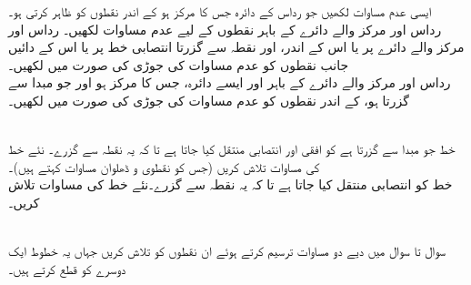 ایسی  عدم مساوات لکھیں جو رداس  کے دائرہ جس کا مرکز  ہو کے اندر نقطوں کو ظاہر کرتی ہو۔\\
رداس  اور مرکز  والے دائرے کے باہر نقطوں کے لیے عدم مساوات لکھیں۔
رداس  اور مرکز  والے  دائرے پر یا اس کے اندر، اور نقطہ   سے گزرتا انتصابی خط پر یا اس کے دائیں جانب نقطوں کو عدم مساوات کی جوڑی کی صورت میں لکھیں۔\\
رداس  اور مرکز والے  دائرے کے باہر اور ایسے دائرہ، جس کا مرکز  ہو اور جو مبدا سے گزرتا ہو، کے اندر نقطوں کو عدم مساوات کی جوڑی کی صورت میں لکھیں۔

\\

خط  جو مبدا سے گزرتا ہے کو افقی اور انتصابی منتقل کیا جاتا ہے تا کہ یہ نقطہ  سے گزرے۔ نئے خط کی مساوات تلاش کریں (جس کو نقطوی و ڈھلوان مساوات کہتے ہیں)۔\\
خط  کو انتصابی منتقل کیا جاتا ہے تا کہ یہ نقطہ  سے گزرے۔نئے خط کی مساوات تلاش کریں۔

\\

سوال  تا سوال  میں دیے دو مساوات ترسیم کرتے ہوئے ان نقطوں کو تلاش کریں جہاں یہ خطوط ایک دوسرے کو قطع کرتے ہیں۔


